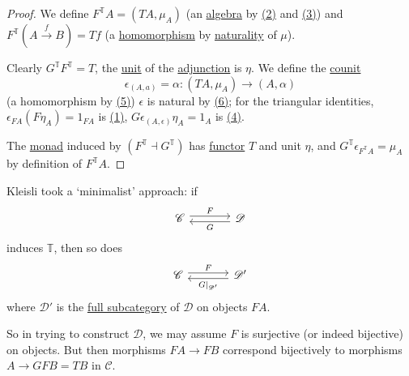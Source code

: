 \documentclass{article}
\let\to\longrightarrow
\begin{document}
\begin{proof}
  We define $F^\mathbb{T} A = (TA, \mu_A)$ (an \hyperlink{def:em}{algebra} by \hyperlink{eq:monad2}{(2)} and \hyperlink{eq:monad3}{(3)}) and $F^\mathbb{T}(A \overset{f}\to B) = Tf$ (a \hyperlink{def:em}{homomorphism} by \hyperlink{def:nattrans}{naturality} of $\mu$).

  Clearly $G^\mathbb{T} F^\mathbb{T} = T$, the \hyperlink{def:unit}{unit} of the \hyperlink{def:adj}{adjunction} is $\eta$.
  We define the \hyperlink{def:counit}{counit}
  \begin{equation*}\epsilon_{(A,a)} = \alpha: (TA, \mu_A) \to (A, \alpha)\end{equation*}
  (a homomorphism by \hyperlink{eq:em5}{(5)})
  $\epsilon$ is natural by \hyperlink{eq:em6}{(6)}; for the triangular identities, $\epsilon_{FA} (F \eta_A) = 1_{FA}$ is \hyperlink{eq:monad1}{(1)}, $G \epsilon_{(A,\epsilon)} \eta_A = 1_A$ is \hyperlink{eq:em4}{(4)}.

  The \hyperlink{def:monad}{monad} induced by $(F^\mathbb{T} \dashv G^\mathbb{T})$ has \hyperlink{def:funct}{functor} $T$ and unit $\eta$, and $G^\mathbb{T} \epsilon_{F^\mathbb{T} A} = \mu_A$ by definition of $F^\mathbb{T} A$.
\end{proof}

Kleisli took a `minimalist' approach: if
\begin{equation*}
  \begin{tikzcd}[column sep=large]
    \mathscr{C} \rar[shift left]{F} & \mathscr{D} \lar[shift left]{G}
  \end{tikzcd}
\end{equation*}
induces $\mathbb{T}$, then so does
\begin{equation*}
  \begin{tikzcd}[column sep=large]
    \mathscr{C} \rar[shift left]{F} & \mathscr{D}' \lar[shift left]{G|_{\mathscr{D}'}}
  \end{tikzcd}
\end{equation*}
where $\mathscr{D}'$ is the \hyperlink{def:fulls}{full subcategory} of $\mathscr{D}$ on objects $FA$.

So in trying to construct $\mathscr{D}$, we may assume $F$ is surjective (or indeed bijective) on objects.
But then morphisms $FA \to FB$ correspond bijectively to morphisms $A \to GFB = TB$ in $\mathscr{C}$.
\end{document}
